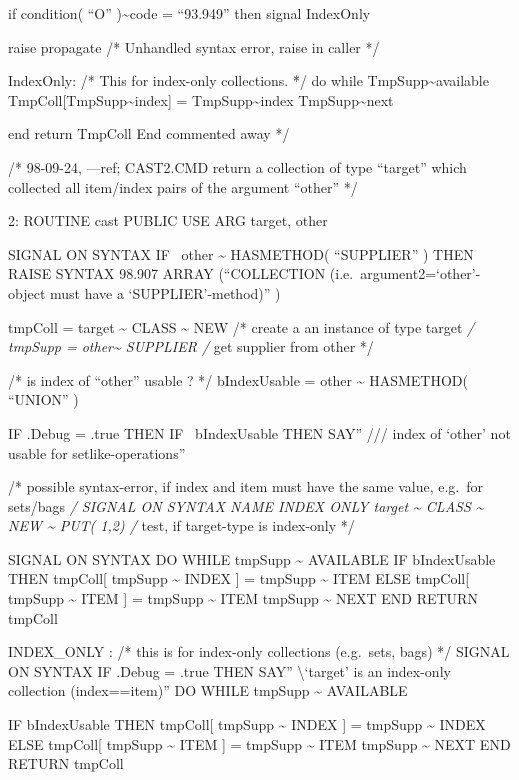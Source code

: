 if condition( ``O'' )\textasciitilde code = ``93.949'' then signal
IndexOnly

raise propagate /* Unhandled syntax error, raise in caller */

IndexOnly: /* This for index-only collections. */ do while
TmpSupp\textasciitilde available
TmpColl{[}TmpSupp\textasciitilde index{]} = TmpSupp\textasciitilde index
TmpSupp\textasciitilde next

end return TmpColl End commented away */

/* 98-09-24, ---ref; CAST2.CMD return a collection of type ``target''
which collected all item/index pairs of the argument ``other'' */

2: ROUTINE cast PUBLIC USE ARG target, other

SIGNAL ON SYNTAX IF ~other \textasciitilde{} HASMETHOD( ``SUPPLIER'' )
THEN RAISE SYNTAX 98.907 ARRAY (``COLLECTION
(i.e.~argument2=`other'-object must have a `SUPPLIER'-method)'' )

tmpColl = target \textasciitilde{} CLASS \textasciitilde{} NEW /* create
a an instance of type target \emph{/ tmpSupp = other\textasciitilde{}
SUPPLIER /} get supplier from other */

/* is index of ``other'' usable ? */ bIndexUsable = other
\textasciitilde{} HASMETHOD( ``UNION'' )

IF .Debug = .true THEN IF ~bIndexUsable THEN SAY'' /// index of `other'
not usable for setlike-operations''

/* possible syntax-error, if index and item must have the same value,
e.g.~for sets/bags \emph{/ SIGNAL ON SYNTAX NAME INDEX ONLY target
\textasciitilde{} CLASS \textasciitilde{} NEW \textasciitilde{} PUT(
1,2) /} test, if target-type is index-only */

SIGNAL ON SYNTAX DO WHILE tmpSupp \textasciitilde{} AVAILABLE IF
bIndexUsable THEN tmpColl{[} tmpSupp \textasciitilde{} INDEX {]} =
tmpSupp \textasciitilde{} ITEM ELSE tmpColl{[} tmpSupp \textasciitilde{}
ITEM {]} = tmpSupp \textasciitilde{} ITEM tmpSupp \textasciitilde{} NEXT
END RETURN tmpColl

INDEX\_ONLY : /* this is for index-only collections (e.g.~sets, bags) */
SIGNAL ON SYNTAX IF .Debug = .true THEN SAY'' \textbackslash{}`target'
is an index-only collection (index==item)'' DO WHILE tmpSupp
\textasciitilde{} AVAILABLE

IF bIndexUsable THEN tmpColl{[} tmpSupp \textasciitilde{} INDEX {]} =
tmpSupp \textasciitilde{} INDEX ELSE tmpColl{[} tmpSupp
\textasciitilde{} ITEM {]} = tmpSupp \textasciitilde{} ITEM tmpSupp
\textasciitilde{} NEXT END RETURN tmpColl

